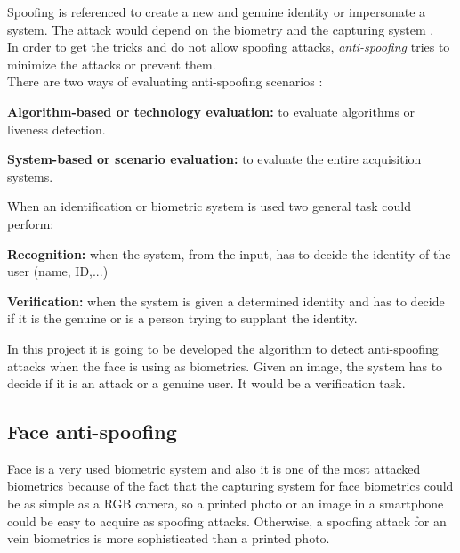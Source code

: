 Spoofing is referenced to create a new and genuine identity or impersonate a system. The attack would depend on the biometry and the capturing system \cite{Spoofing_survey}.\\

In order to get the tricks and do not allow spoofing attacks, \textit{anti-spoofing} tries to minimize the attacks or prevent them.\\

There are two ways of evaluating anti-spoofing scenarios \cite{Spoofing_survey}:
\begin{description}[noitemsep,topsep=8pt,parsep=0pt,partopsep=20pt]
\item \textbf{Algorithm-based or technology evaluation:} to evaluate algorithms or liveness detection.
\item \textbf{System-based or scenario evaluation:} to evaluate the entire acquisition systems.
\end{description}

When an identification or biometric system is used two general task could perform:
\begin{description}[noitemsep,topsep=8pt,parsep=0pt,partopsep=20pt]
\item \textbf{Recognition:} when the system, from the input, has to decide the identity of the user (name, ID,...)
\item \textbf{Verification:} when the system is given a determined identity and has to decide if it is the genuine or is a person trying to supplant the identity.
\end{description}

In this project it is going to be developed the algorithm to detect anti-spoofing attacks when the face is using as biometrics. Given an image, the system has to decide if it is an attack or a genuine user. It would be a verification task.\\

\subsection{Face anti-spoofing}
Face is a very used biometric system and also it is one of the most attacked biometrics because of the fact that the capturing system for face biometrics could be as simple as a RGB camera, so a printed photo or an image in a smartphone could be easy to acquire as spoofing attacks. Otherwise, a spoofing attack for an vein biometrics is more sophisticated than a printed photo.\\

